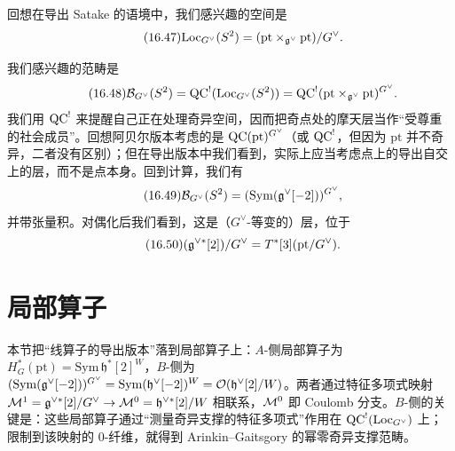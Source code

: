 回想在导出 Satake 的语境中，我们感兴趣的空间是
\begin{equation}\tag{16.47}
\mathrm{Loc}_{G^\vee}(S^2)=(\mathrm{pt}\times_{\mathfrak{g}^\vee}\mathrm{pt})/G^\vee.
\end{equation}

我们感兴趣的范畴是
\begin{equation}\tag{16.48}
\mathcal{B}_{G^\vee}(S^2)=\mathrm{QC}^!(\mathrm{Loc}_{G^\vee}(S^2))=\mathrm{QC}^!(\mathrm{pt}\times_{\mathfrak{g}^\vee}\mathrm{pt})^{G^\vee}.
\end{equation}
我们用 $\mathrm{QC}^!$ 来提醒自己正在处理奇异空间，因而把奇点处的摩天层当作“受尊重的社会成员”。回想阿贝尔版本考虑的是 $\mathrm{QC}(\mathrm{pt})^{G^\vee}$（或 $\mathrm{QC}^!$，但因为 $\mathrm{pt}$ 并不奇异，二者没有区别）；但在导出版本中我们看到，实际上应当考虑点上的导出自交上的层，而不是点本身。回到计算，我们有
\begin{equation}\tag{16.49}
\mathcal{B}_{G^\vee}(S^2)=(\mathrm{Sym}(\mathfrak{g}^\vee[-2]))^{G^\vee},
\end{equation}
并带张量积。对偶化后我们看到，这是（$G^\vee$-等变的）层，位于
\begin{equation}\tag{16.50}
(\mathfrak{g}^{\vee*}[2])/G^\vee=T^*[3](\mathrm{pt}/G^\vee).
\end{equation}

\section{局部算子}
\begin{sectionkey}
本节把“线算子的导出版本”落到局部算子上：$A$-侧局部算子为 $H^*_G(\mathrm{pt})=\mathrm{Sym}\,\mathfrak{h}^*[2]^W$，$B$-侧为 $(\mathrm{Sym}(\mathfrak{g}^\vee[-2]))^{G^\vee}=\mathrm{Sym}(\mathfrak{h}^\vee[-2])^W=\mathcal{O}(\mathfrak{h}^\vee[2]/W)$。两者通过特征多项式映射 $\mathcal{M}^1=\mathfrak{g}^{\vee*}[2]/G^\vee\to\mathcal{M}^0=\mathfrak{h}^{\vee*}[2]/W$ 相联系，$\mathcal{M}^0$ 即 Coulomb 分支。$B$-侧的关键是：这些局部算子通过“测量奇异支撑的特征多项式”作用在 $\mathrm{QC}^!(\mathrm{Loc}_{G^\vee})$ 上；限制到该映射的 $0$-纤维，就得到 Arinkin--Gaitsgory 的幂零奇异支撑范畴。
\end{sectionkey}

